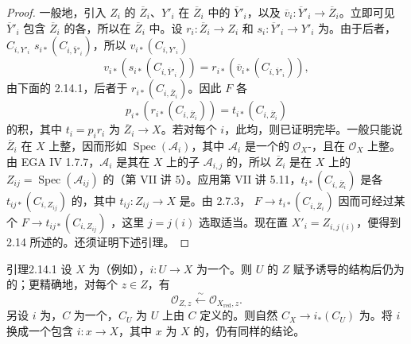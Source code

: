 \begin{proof}
一般地，引入 $Z_i$ 的 $\overline Z_i$、$Y'_i$ 在 $\overline Z_i$ 中的 $\overline Y'_i$，以及 $\overline v_i:\overline Y'_i\to\overline Z_i$。立即可见 $\overline Y'_i$ 包含 $\overline Z_i$ 的各，所以在 $\overline Z_i$ 中。设 $r_i:\overline Z_i\to Z_i$ 和 $s_i:\overline Y'_i\to Y'_i$ 为。由于后者，$C_{i,Y'_i}$  $s_{i*}(C_{i,\overline Y'_i})$，所以 $v_{i*}(C_{i,Y'_i})$ 
\[
v_{i*}(s_{i*}(C_{i,\overline Y'_i}))
 =r_{i*}(\overline v_{i*}(C_{i,\overline Y'_i})),
\]
由下面的 2.14.1，后者于 $r_{i*}(C_{i,\overline Z_i})$。因此 $F$ 各
\[
p_{i*}(r_{i*}(C_{i,\overline Z_i}))=t_{i*}(C_{i,\overline Z_i})
\]
的积，其中 $t_i=p_ir_i$ 为 $\overline Z_i\to X$。若对每个 $i$，此均，则已证明完毕。一般只能说 $\overline Z_i$ 在 $X$ 上整，因而形如 $\operatorname{Spec}(\mathcal A_i)$，其中 $\mathcal A_i$ 是一个的 $\mathcal O_X$-，且在 $\mathcal O_X$ 上整。由 EGA IV 1.7.7，$\mathcal A_i$ 是其在 $X$ 上的子 $\mathcal A_{i,j}$ 的，所以 $\overline Z_i$ 是在 $X$ 上的 $Z_{ij}=\operatorname{Spec}(\mathcal A_{ij})$ 的（第 VII 讲 5）。应用第 VII 讲 5.11，$t_{i*}(C_{i,\overline Z_i})$ 是各 $t_{ij*}(C_{i,Z_{ij}})$ 的，其中 $t_{ij}:Z_{ij}\to X$ 是。由 2.7.3， $F\to t_{i*}(C_{i,\overline Z_i})$ 因而可经过某个 $F\to t_{ij*}(C_{i,Z_{ij}})$ ，这里 $j=j(i)$ 选取适当。现在置 $X'_i=Z_{i,j(i)}$，便得到 2.14 所述的。还须证明下述引理。
\end{proof}
\begin{SGAresult}{引理}{2.14.1}
设 $X$ 为（例如），$i:U\to X$ 为一个。则 $U$ 的 $Z$ 赋予诱导的结构后仍为的；更精确地，对每个 $z\in Z$，有
\[
\mathcal O_{Z,z}\xleftarrow{\sim}\mathcal O_{X_{\mathrm{red}},z}.
\]
另设 $i$ 为，$C$ 为一个，$C_U$ 为 $U$ 上由 $C$ 定义的。则自然 $C_X\to i_*(C_U)$ 为。将 $i$ 换成一个包含 $i:x\to X$，其中 $x$ 为 $X$ 的，仍有同样的结论。
\end{SGAresult}
